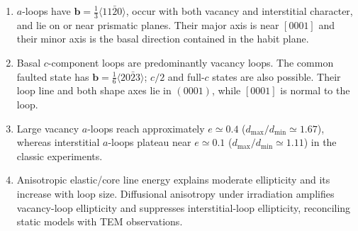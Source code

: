 \documentclass[11pt]{article}
\newcommand{\bvec}{\bm b}
\begin{document}
\begin{enumerate}
 \item $a$-loops have $\bvec=\tfrac13\langle11\bar20\rangle$, occur with both vacancy and interstitial character, and lie on or near prismatic planes. Their major axis is near $[0001]$ and their minor axis is the basal direction contained in the habit plane.
 \item Basal $c$-component loops are predominantly vacancy loops. The common faulted state has $\bvec=\tfrac16\langle20\bar23\rangle$; $c/2$ and full-$c$ states are also possible. Their loop line and both shape axes lie in $(0001)$, while $[0001]$ is normal to the loop.
 \item Large vacancy $a$-loops reach approximately $e\simeq0.4$ ($d_{\max}/d_{\min}\simeq1.67$), whereas interstitial $a$-loops plateau near $e\simeq0.1$ ($d_{\max}/d_{\min}\simeq1.11$) in the classic experiments.
 \item Anisotropic elastic/core line energy explains moderate ellipticity and its increase with loop size. Diffusional anisotropy under irradiation amplifies vacancy-loop ellipticity and suppresses interstitial-loop ellipticity, reconciling static models with TEM observations.
\end{enumerate}



\end{document}
